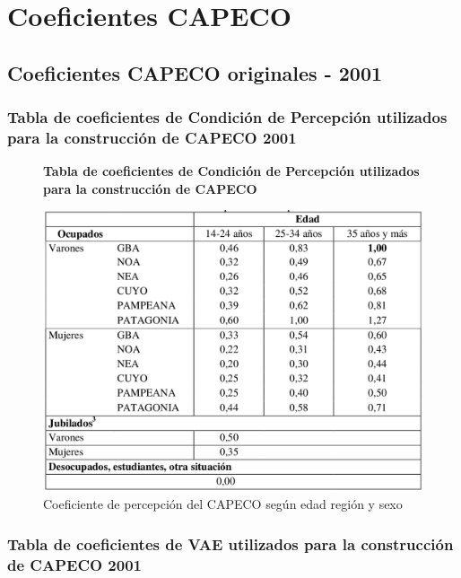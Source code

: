 \section{Coeficientes CAPECO}

\subsection{Coeficientes CAPECO originales - 2001}

\subsubsection{Tabla de coeficientes de Condición de Percepción utilizados para la construcción de CAPECO 2001}

\begin{figure}[h]
	\centering
	\textbf{Tabla de coeficientes de Condición de Percepción utilizados para la construcción de CAPECO}\par\medskip
	\includegraphics[scale = 0.2]{../img/anexo/capecoOriginalCP.png}
	\caption{Coeficiente de percepción del CAPECO según edad región y sexo}
\end{figure}

\subsubsection{Tabla de coeficientes de VAE utilizados para la construcción de CAPECO 2001}


